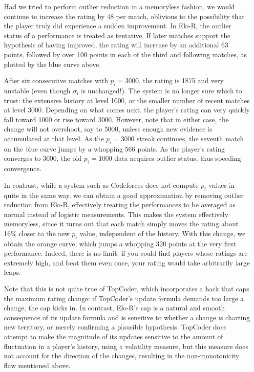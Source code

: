 \documentclass{article}
\begin{document}
Had we tried to perform outlier reduction in a memoryless fashion, we would continue to increase the rating by 48 per match, oblivious to the possibility that the player truly did experience a sudden improvement. In Elo-R, the outlier status of a performance is treated as tentative. If later matches support the hypothesis of having improved, the rating will increase by an additional 63 points, followed by over 100 points in each of the third and following matches, as plotted by the blue curve above.

After six consecutive matches with $p_i = 3000$, the rating is 1875 and very unstable (even though $\sigma_i$ is unchanged!). The system is no longer sure which to trust: the extensive history at level 1000, or the smaller number of recent matches at level 3000. Depending on what comes next, the player's rating can very quickly fall toward 1000 or rise toward 3000. However, note that in either case, the change will not overshoot, say to 5000, unless enough new evidence is accumulated at that level. As the $p_i=3000$ streak continues, the seventh match on the blue curve jumps by a whopping 566 points. As the player's rating converges to 3000, the old $p_i = 1000$ data acquires outlier status, thus speeding convergence.

In contrast, while a system such as Codeforces does not compute $p_i$ values in quite in the same way, we can obtain a good approximation by removing outlier reduction from Elo-R, effectively treating the performances to be averaged as normal instead of logistic measurements. This makes the system effectively memoryless, since it turns out that each match simply moves the rating about 16\% closer to the new $p_i$ value, independent of the history. With this change, we obtain the orange curve, which jumps a whopping 320 points at the very first performance. Indeed, there is no limit: if you could find players whose ratings are extremely high, and beat them even once, your rating would take arbitrarily large leaps.

Note that this is not quite true of TopCoder, which incorporates a hack that caps the maximum rating change: if TopCoder's update formula demands too large a change, the cap kicks in. In contrast, Elo-R's cap is a natural and smooth consequence of its update formula and is sensitive to whether a change is charting new territory, or merely confirming a plausible hypothesis. TopCoder does attempt to make the magnitude of its updates sensitive to the amount of fluctuation in a player's history, using a volatility measure, but this measure does not account for the direction of the changes, resulting in the non-monotonicity flaw mentioned above.
\end{document}
